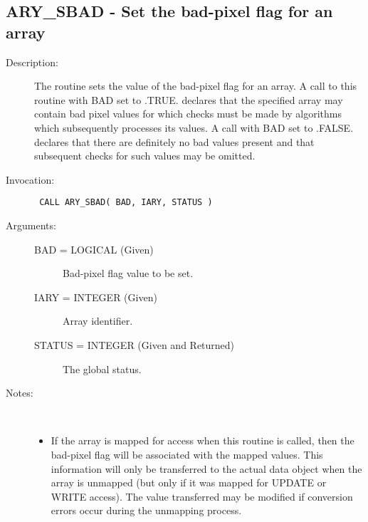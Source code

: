 \documentclass[twoside,11pt]{article}
\newcommand{\xlabel}[1]{}
\newlength{\sstbannerlength}
\newlength{\sstcaptionlength}
\newlength{\sstexampleslength}
\newlength{\sstexampleswidth}
\newcommand{\sstroutine}[3]{
   \goodbreak
   \rule{\textwidth}{0.5mm}
   \vspace{-7ex}
   \newline
   \settowidth{\sstbannerlength}{{\Large {\bf #1}}}
   \setlength{\sstcaptionlength}{\textwidth}
   \setlength{\sstexampleslength}{\textwidth}
   \addtolength{\sstbannerlength}{0.5em}
   \addtolength{\sstcaptionlength}{-2.0\sstbannerlength}
   \addtolength{\sstcaptionlength}{-5.0pt}
   \settowidth{\sstexampleswidth}{{\bf Examples:}}
   \addtolength{\sstexampleslength}{-\sstexampleswidth}
   \parbox[t]{\sstbannerlength}{\flushleft{\Large {\bf #1}}}
   \parbox[t]{\sstcaptionlength}{\center{\Large #2}}
   \parbox[t]{\sstbannerlength}{\flushright{\Large {\bf #1}}}
   \begin{description}
      #3
   \end{description}
}
\newcommand{\sstdescription}[1]{\item[Description:] #1}
\newcommand{\sstinvocation}[1]{\item[Invocation:]\hspace{0.4em}{\tt #1}}
\newcommand{\sstarguments}[1]{
   \item[Arguments:] \mbox{} \\
   \vspace{-3.5ex}
   \begin{description}
      #1
   \end{description}
}
\newcommand{\sstsubsection}[1]{ \item[{#1}] \mbox{} \\}
\newcommand{\sstnotes}[1]{\item[Notes:] \mbox{} \\[1.3ex] #1}
\newcommand{\sstitemlist}[1]{
  \mbox{} \\
  \vspace{-3.5ex}
  \begin{itemize}
     #1
  \end{itemize}
}
\newcommand{\sstitem}{\item}
\newcommand{\ssttt}{\tt}
\renewcommand{\sstroutine}[3]{
      \subsection{#1\xlabel{#1}-\label{#1}#2}
      \begin{description}
         #3
      \end{description}
   }
\renewcommand{\sstdescription}[1]{\item[Description:]
      \begin{description}
         #1
      \end{description}
   }
\renewcommand{\sstinvocation}[1]{\item[Invocation:]
      \begin{description}
         {\ssttt #1}
      \end{description}
   }
\renewcommand{\sstarguments}[1]{
      \item[Arguments:]
      \begin{description}
         #1
      \end{description}
   }
\renewcommand{\sstsubsection}[1]{\item[{#1}]}
\renewcommand{\sstnotes}[1]{\item[Notes:]
      \begin{description}
         #1
      \end{description}
   }
\newcommand{\sstitemlist}[1]{
      \begin{itemize}
         #1
      \end{itemize}
   }
\begin{document}
\sstroutine{
   ARY\_SBAD
}{
   Set the bad-pixel flag for an array
}{
   \sstdescription{
      The routine sets the value of the bad-pixel flag for an array. A
      call to this routine with BAD set to .TRUE. declares that the
      specified array may contain bad pixel values for which checks
      must be made by algorithms which subsequently processes its
      values.  A call with BAD set to .FALSE. declares that there are
      definitely no bad values present and that subsequent checks for
      such values may be omitted.
   }
   \sstinvocation{
      CALL ARY\_SBAD( BAD, IARY, STATUS )
   }
   \sstarguments{
      \sstsubsection{
         BAD = LOGICAL (Given)
      }{
         Bad-pixel flag value to be set.
      }
      \sstsubsection{
         IARY = INTEGER (Given)
      }{
         Array identifier.
      }
      \sstsubsection{
         STATUS = INTEGER (Given and Returned)
      }{
         The global status.
      }
   }
   \sstnotes{
      \sstitemlist{

         \sstitem
         If the array is mapped for access when this routine is called,
         then the bad-pixel flag will be associated with the mapped
         values. This information will only be transferred to the actual
         data object when the array is unmapped (but only if it was mapped
         for UPDATE or WRITE access). The value transferred may be
         modified if conversion errors occur during the unmapping process.
      }
   }
}
\end{document}
